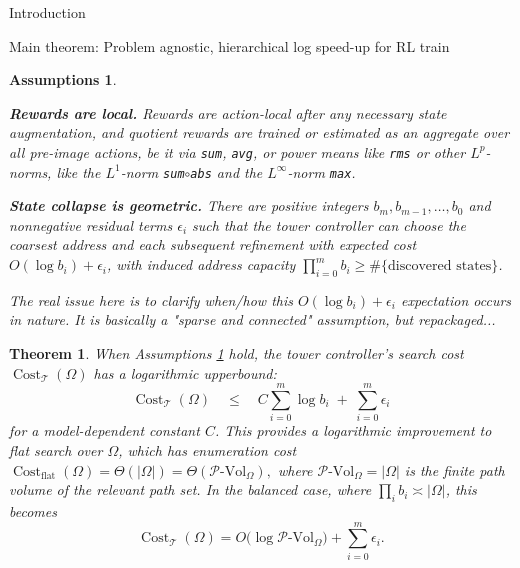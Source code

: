\documentclass[11pt]{article}
\newtheorem{assumptions}[subsubsection]{Assumptions}
\newtheorem{theorem}[subsubsection]{Theorem}
\newcommand{\PVol}{\mathcal{P}\text{-}\mathrm{Vol}}
\newcommand{\cost}{\operatorname{Cost}}
\begin{document}
\begin{section}{Introduction}
\begin{subsection}{Main theorem: Problem agnostic, hierarchical log speed-up for RL train}
\begin{assumptions}\label{ass: simple ass}
\normalfont

{\bf\em Rewards are local.} Rewards are action-local after any necessary state augmentation, and quotient rewards are trained or estimated as an aggregate over all pre-image actions, be it via \texttt{sum}, \texttt{avg}, or power means like \texttt{rms} or other $L^{p}$-norms, like the $L^{1}$-norm \texttt{sum}$\circ$\texttt{abs} and the $L^\infty$-norm \texttt{max}.
 

{\bf\em State collapse is geometric.} There are positive integers $b_m,b_{m-1},\ldots,b_0$ and nonnegative residual terms $\epsilon_i$ such that the tower controller can choose the coarsest address and each subsequent refinement with expected cost
$O(\log b_i)+\epsilon_i$, with induced address capacity $\prod_{i=0}^{m} b_i \ge \#\{\text{discovered states}\}$.

{\color{blue} The real issue here is to clarify when/how this $O(\log b_i)+\epsilon_i$ expectation occurs in nature. It is basically a "sparse and connected" assumption, but repackaged...}


\end{assumptions}

\begin{theorem}\label{theorem: main}
When Assumptions \ref{ass: simple ass} hold, the tower controller's search cost $\cost_{\mathcal{T}}(\Omega)$ has a logarithmic upperbound:
$$
    \cost_{\mathcal{T}}(\Omega)
    \quad\le\quad
    C\sum_{i=0}^{m}\log b_i \;+\; \sum_{i=0}^{m}\epsilon_i
$$
for a model-dependent constant $C$. This provides a logarithmic improvement to flat search over $\Omega$, which has enumeration cost $
    \cost_{\mathrm{flat}}(\Omega)=\Theta(|\Omega|)=\Theta(\PVol_{\Omega}),
$
where $\PVol_{\Omega}=|\Omega|$ is the finite path volume of the relevant path set.  In the balanced case, where $\prod_i b_i\asymp |\Omega|$, this becomes
$$
    \cost_{\mathcal{T}}(\Omega)
    =O\bigl(\log \PVol_{\Omega}\bigr)+\sum_{i=0}^{m}\epsilon_i.
$$
\end{theorem}


\end{subsection}
\end{section}
\end{document}
